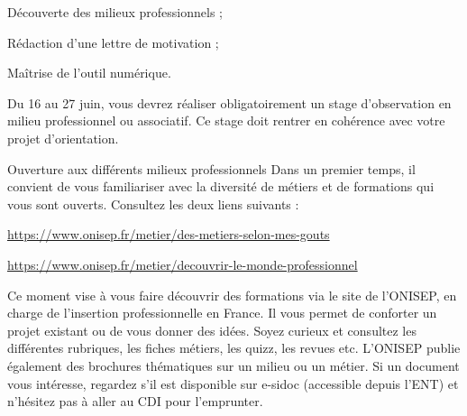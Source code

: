 \teteSndAP
{}

\begin{objectifs}
  \item Découverte des milieux professionnels ;
  \item Rédaction d’une lettre de motivation ;
  \item Maîtrise de l’outil numérique.
\end{objectifs}
\medskip

\begin{contexte}
  Du 16 au 27 juin, vous devrez réaliser obligatoirement un stage d’observation en milieu professionnel ou associatif. Ce stage doit rentrer en cohérence avec votre projet d’orientation.
\end{contexte}
\medskip

\begin{doc}{Ouverture aux différents milieux professionnels}
  Dans un premier temps, il convient de vous familiariser avec la diversité de métiers et de formations qui vous sont ouverts.
  Consultez les deux liens suivants :
  \begin{listePoints}
    \item \url{https://www.onisep.fr/metier/des-metiers-selon-mes-gouts} 
    \item \url{https://www.onisep.fr/metier/decouvrir-le-monde-professionnel}
  \end{listePoints}
  Ce moment vise à vous faire découvrir des formations via le site de l’ONISEP, en charge de l’insertion professionnelle en France. Il vous permet de conforter un projet existant ou de vous donner des idées.
  Soyez curieux et consultez les différentes rubriques, les fiches métiers, les quizz, les revues etc.
  L’ONISEP publie également des brochures thématiques sur un milieu ou un métier. Si un document vous intéresse, regardez s’il est disponible sur e-sidoc (accessible depuis l’ENT) et n’hésitez pas à aller au CDI pour l’emprunter. 
\end{doc}

